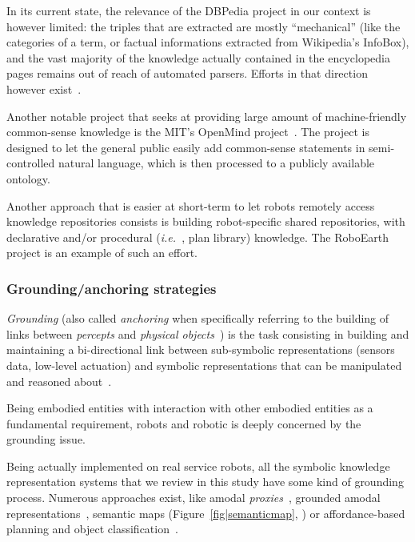 \documentclass[a4paper, twocolumn]{article}
\newcommand{\ie}{{\textit{i.e.\ }}}
\begin{document}
In its current state, the relevance of the DBPedia project in our context is
however limited: the triples that are extracted are mostly ``mechanical'' (like
the categories of a term, or factual informations extracted from Wikipedia's
InfoBox), and the vast majority of the knowledge actually contained in the
encyclopedia pages remains out of reach of automated parsers. Efforts in that
direction however exist~\cite{Nyga2009, Fader2011}.

Another notable project that seeks at providing large amount of
machine-friendly common-sense knowledge is the MIT's OpenMind
project~\cite{Singh2002}. The project is designed to let the general public
easily add common-sense statements in semi-controlled natural language, which is
then processed to a publicly available ontology.

Another approach that is easier at short-term to let robots remotely access
knowledge repositories consists is building robot-specific shared repositories,
with declarative and/or procedural (\ie, plan library) knowledge. The
RoboEarth~\cite{Waibel2011} project is an example of such an effort.

\subsubsection{Grounding/anchoring strategies}
\label{sect|grounding}

\emph{Grounding} (also called \emph{anchoring} when specifically referring to the
building of links between \emph{percepts} and \emph{physical
objects}~\cite{Coradeschi2003}) is the task consisting in building and
maintaining a bi-directional link between sub-symbolic representations (sensors
data, low-level actuation) and symbolic representations that can be
manipulated and reasoned about~\cite{Harnad1990}.

Being embodied entities with interaction with other embodied entities as a
fundamental requirement, robots and robotic is deeply concerned by the
grounding issue.

Being actually implemented on real service robots, all the symbolic knowledge
representation systems that we review in this study have some kind of grounding
process. Numerous approaches exist, like amodal
\emph{proxies}~\cite{Jacobsson2008}, grounded amodal
representations~\cite{Alami2011, Mavridis2006}, semantic maps
(Figure~\ref{fig|semanticmap}, \cite{Nuechter2008, Galindo2008,Blodow2011}) or
affordance-based planning and object classification~\cite{Lorken2008,
Varadarajan2011}.
\end{document}
